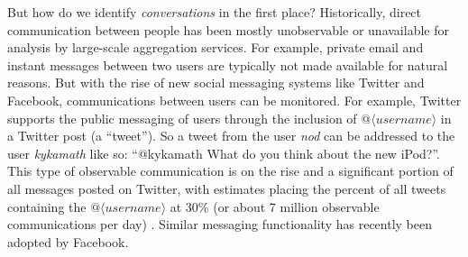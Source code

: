 \documentclass{sig-alternate}
\begin{document}







But how do we identify \textit{conversations} in the first place? Historically, direct communication between people has been mostly unobservable or
unavailable for analysis by large-scale aggregation services. For example,
private email and instant messages between two users are typically not made
available for natural reasons. But with the rise of new social messaging systems
like Twitter and Facebook, communications between users can be monitored. For example, Twitter
supports the public messaging of users through the inclusion of $@\langle username \rangle$
in a Twitter post (a ``tweet''). So a tweet from the user \textit{nod} can be
addressed to the user \textit{kykamath} like so: ``@kykamath What do you think
about the new iPod?''. This type of observable communication is on the rise and a
significant portion of all messages posted on Twitter, with estimates placing the
percent of all tweets containing the $@\langle username \rangle$  at 30\% (or about 7 million
observable communications per day) \cite{website.gigatweet}. Similar messaging
functionality has recently been adopted by Facebook.
\end{document}
